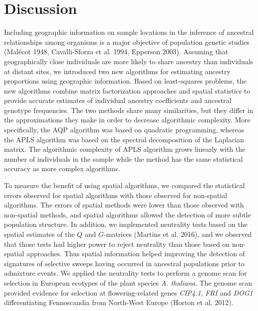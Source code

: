 \clearpage
\newpage



\section{Discussion}

Including geographic information on sample locations in the inference of ancestral relationships among  organisms is a major objective of population genetic studies (Mal\'ecot 1948, Cavalli-Sforza et al. 1994, Epperson 2003). Assuming that geographically close individuals are more likely to share ancestry than individuals at distant sites, we introduced two new  algorithms for estimating ancestry proportions using geographic information. Based on least-squares problems, the new algorithms combine matrix factorization approaches and spatial statistics to provide accurate estimates of individual ancestry coefficients and ancestral genotype frequencies. The two methods share many similarities, but they differ in the approximations they make in order to decrease algorithmic complexity.  More specifically, the AQP algorithm was based on quadratic programming, whereas the APLS algorithm was based on the spectral decomposition of the Laplacian matrix. The algorithmic complexity of APLS algorithm grows linearly with the number of individuals in the sample while the method has the same statistical accuracy as more complex algorithms. 

To measure the benefit of using spatial algorithms, we compared the statistical errors observed for spatial algorithms with those observed for non-spatial algorithms. The errors of spatial methods were lower than those observed  with non-spatial methods, and spatial algorithms allowed the detection of more subtle population structure. In addition, we implemented neutrality tests based on the spatial estimates of the $Q$ and $G$-matrices (Martins et al. 2016), and we observed that those tests had higher power to reject neutrality than those based on non-spatial approaches. Thus spatial information helped improving the detection of signatures of selective sweeps having occurred  in ancestral populations prior to admixture events. We applied the neutrality tests to perform a genome scan for selection in European ecotypes of the plant species {\it A. thaliana}. The genome scan provided evidence for selection at flowering-related genes {\it CIP4.1}, {\it FRI} and {\it DOG1} differentiating Fennoscandia from North-West Europe (Horton et al. 2012).
 

